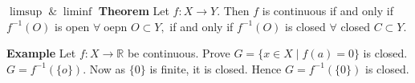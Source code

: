 \documentclass[12pt]{article}
\begin{document}
\begin{section}{\bf $\limsup\;\&\;\liminf$}
\vspace{1\baselineskip}
{\bf Theorem}
Let $f\colon X\to Y.$ Then $f$ is continuous if and only if $f^{-1}(O)$ is open $\forall\;$oepn $O\subset Y,$ if and only if $f^{-1}(O)$ is closed $\forall$ closed $C\subset Y$.

\vspace{1\baselineskip}
{\bf Example} Let $f\colon X\to \mathbb{R}$ be continuous. Prove $G = \{x\in X\;|\; f(a)=0\}$ is closed.\\

$G=f^{-1}(\{o\}).$ Now as $\{0\}$ is finite, it is closed. Hence $G = f^{-1}(\{0\})$ is closed.



\end{section}
\end{document}
